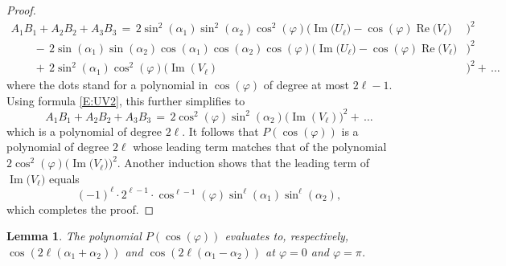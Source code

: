 \documentclass[11pt,reqno]{amsart}
\newtheorem{lemma}[theorem]{Lemma}
\theoremstyle{definition}
\renewcommand{\phi}{\varphi}
\renewcommand{\Re}{\operatorname{Re}}
\renewcommand{\Im}{\operatorname{Im}}
\begin{document}
\begin{sloppypar}
\begin{proof}
\begin{align*}
A_1 B_1 + A_2 B_2 + A_3 B_3\, =\,  2\sin^2(\alpha_1) \sin^2(\alpha_2) \cos^2 (\phi) \big(\Im \big(U_{\ell}\big) - \cos(\phi) \Re \big(V_{\ell}\big) & \big)^2 \\ 
\qquad  - \, 2 \sin(\alpha_1) \sin(\alpha_2) \cos(\alpha_1) \cos(\alpha_2) \cos (\phi) \big(\Im \big(U_{\ell}\big) - \cos(\phi) \Re \big(V_{\ell}\big)&  \big)^2  \\
 \qquad +\, 2 \sin^2 (\alpha_1) \cos^2(\phi) \big( \Im(V_{\ell}) & \big)^2 +\, \ldots
\end{align*}
where the dots stand for a polynomial in $\cos(\phi)$ of degree at most $2\ell - 1$. Using formula \eqref{E:UV2}, this further simplifies to 
\[
A_1 B_1 + A_2 B_2 + A_3 B_3\, =\,2 \cos^2(\phi) \sin^2(\alpha_2) \big(\Im(V_{\ell})\big)^2 +\, \ldots
\]
which is a polynomial of degree $2\ell$. It follows that $P(\cos(\phi))$ is a polynomial of degree $2\ell$ whose  leading term matches that of the polynomial $2 \cos^2(\phi) \big(\Im \big(V_{\ell}\big)\big)^2 $. Another induction shows that the leading term of  $\Im\big( V_{\ell} \big)$ equals 
\[
(-1)^{\ell} \cdot 2^{\ell - 1} \cdot \cos^{\ell - 1}(\phi)\sin^{\ell}(\alpha_1)\sin^{\ell}(\alpha_2),
\]
which completes the proof. 
\end{proof}

\begin{lemma}\label{L:four}
The polynomial $P(\cos(\phi))$ evaluates to, respectively, $\cos(2 \ell(\alpha_1 + \alpha_2))$ and $\cos(2\ell(\alpha_1 - \alpha_2))$ at $\phi = 0$ and $\phi = \pi$.
\end{lemma}


\end{sloppypar}
\end{document}
